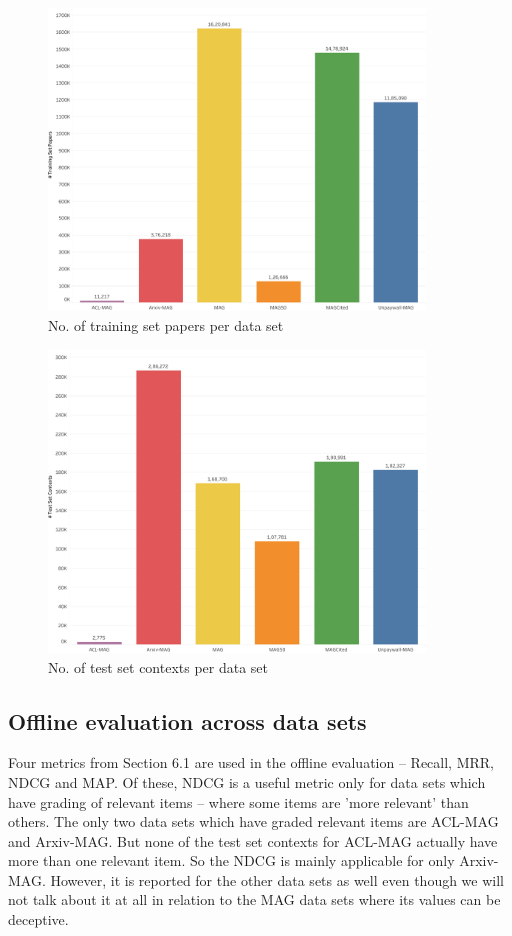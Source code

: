 \begin{figure}
    \centering
    \includegraphics[width=10cm]{figures/Evaluation/trainingteststats.pdf}
    \caption{No. of training set papers per data set}
    \label{fig:trainingsetpapers}
\end{figure}
\begin{figure}
    \centering
    \includegraphics[width=10cm]{figures/Evaluation/testsetcontexts.pdf}
    \caption{No. of test set contexts per data set}
    \label{fig:testsetcontexts}
\end{figure}
\subsection{Offline evaluation across data sets}
Four metrics from Section 6.1 are used in the offline evaluation -- Recall, MRR, NDCG and MAP. Of these, NDCG is a useful metric only for data sets which have grading of relevant items -- where some items are 'more relevant' than others. The only two data sets which have graded relevant items are ACL-MAG and Arxiv-MAG. But none of the test set contexts for ACL-MAG actually have more than one relevant item. So the NDCG is mainly applicable for only Arxiv-MAG. However, it is reported for the other data sets as well even though we will not talk about it at all in relation to the MAG data sets where its values can be deceptive.


